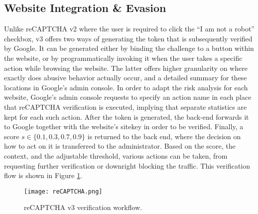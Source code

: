 
\subsection{Website Integration \& Evasion}
Unlike reCAPTCHA v2 where the user is required to click the ``I am not a robot'' checkbox, v3 offers two ways of generating the token that is subsequently verified by Google.
It can be generated either by binding the challenge to a button within the website, or by programmatically invoking it when the user takes a specific action while browsing the website.
The latter offers higher granularity on where exactly does abusive behavior actually occur, and a detailed summary for these locations in Google's admin console.
In order to adapt the risk analysis for each website, Google's admin console requests to specify an action name in each place that reCAPTCHA verification is executed, implying that separate statistics are kept for each such action.
After the token is generated, the back-end forwards it to Google together with the website's sitekey in order to be verified.
Finally, a score $s \in \{0.1,0.3,0.7,0.9\}$ is returned to the back end, where the decision on how to act on it is transferred to the administrator.
Based on the score, the context, and the adjustable threshold, various actions can be taken, from requesting further verification or downright blocking the traffic.
This verification flow is shown in Figure \ref{flow}.

\begin{figure}[htbp]
\centerline{\texttt{[image: reCAPTCHA.png]}}
\caption{reCAPTCHA v3 verification workflow.}
\label{flow}
\end{figure}

